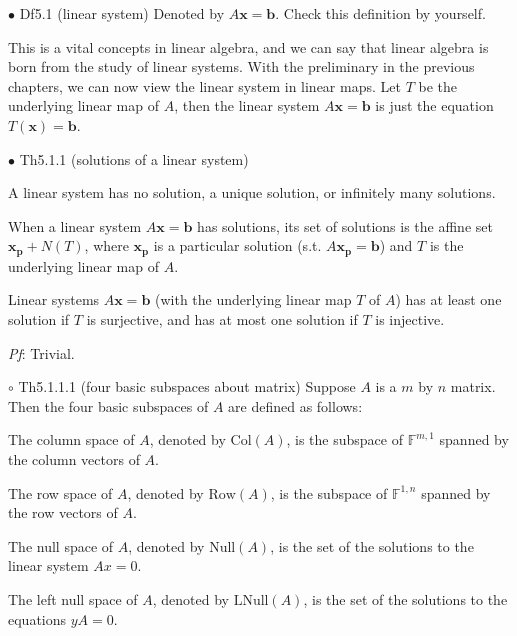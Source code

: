 \documentclass{article}
\begin{document}
\begin{Df}{$\bullet$ Df5.1 (linear system)}
    Denoted by $A\pmb{x} = \pmb{b}$. Check this definition by yourself.
\end{Df}

\begin{Rmk}{}
    This is a vital concepts in linear algebra, and we can say that linear algebra is born from the study of linear systems. With the preliminary in the previous chapters, we can now view the linear system in linear maps. Let $T$ be the underlying linear map of $A$, then the linear system $A\pmb{x} = \pmb{b}$ is just the equation $T(\pmb{x}) = \pmb{b}$. 
\end{Rmk}

\begin{Th}{$\bullet$ Th5.1.1 (solutions of a linear system)}
    \begin{compactenum}
        \item A linear system has no solution, a unique solution, or infinitely many solutions.
        \item When a linear system $A\pmb{x} = \pmb{b}$ has solutions, its set of solutions is the affine set $\pmb{x_p} + N(T)$, where $\pmb{x_p}$ is a particular solution (s.t. $A\pmb{x_p} = \pmb{b}$) and $T$ is the underlying linear map of $A$.
        \item Linear systems $A\pmb{x} = \pmb{b}$ (with the underlying linear map $T$ of $A$) has at least one solution if $T$ is surjective, and has at most one solution if $T$ is injective. 
    \end{compactenum}
    \tcblower
    \textit{Pf}: Trivial.
\end{Th}

\begin{Df}{$\circ$ Th5.1.1.1 (four basic subspaces about matrix)}
    Suppose $A$ is a $m$ by $n$ matrix. Then the four basic subspaces of $A$ are defined as follows:
    \begin{compactenum}
        \item The column space of $A$, denoted by $\text{Col}(A)$, is the subspace of $\mathbb{F}^{m,1}$ spanned by the column vectors of $A$.
        \item The row space of $A$, denoted by $\text{Row}(A)$, is the subspace of $\mathbb{F}^{1,n}$ spanned by the row vectors of $A$.
        \item The null space of $A$, denoted by $\text{Null}(A)$, is the set of the solutions to the linear system $Ax = 0$.
        \item The left null space of $A$, denoted by $\text{LNull}(A)$, is the set of the solutions to the equations $yA = 0$.
    \end{compactenum}
\end{Df}
\end{document}

